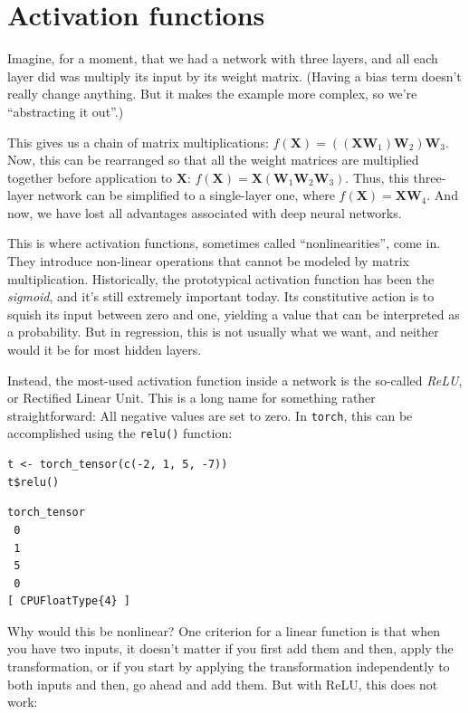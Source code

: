 \documentclass[
  letterpaper,
]{krantz}
\begin{document}
\hypertarget{activation-functions}{%
\section{\texorpdfstring{Activation
functions}{Activation functions}}\label{activation-functions}}

Imagine, for a moment, that we had a network with three layers, and all
each layer did was multiply its input by its weight matrix. (Having a
bias term doesn't really change anything. But it makes the example more
complex, so we're ``abstracting it out''.)

This gives us a chain of matrix multiplications:
\(f(\mathbf{X}) = ((\mathbf{X} \mathbf{W}_1)\mathbf{W}_2)\mathbf{W}_3\).
Now, this can be rearranged so that all the weight matrices are
multiplied together before application to \(\mathbf{X}\):
\(f(\mathbf{X}) = \mathbf{X} (\mathbf{W}_1\mathbf{W}_2\mathbf{W}_3)\).
Thus, this three-layer network can be simplified to a single-layer one,
where \(f(\mathbf{X}) = \mathbf{X} \mathbf{W}_4\). And now, we have lost
all advantages associated with deep neural networks.

This is where activation functions, sometimes called ``nonlinearities'',
come in. They introduce non-linear operations that cannot be modeled by
matrix multiplication. Historically, the prototypical activation
function has been the \emph{sigmoid}, and it's
still extremely important today. Its constitutive action is to squish
its input between zero and one, yielding a value that can be interpreted
as a probability. But in regression, this is not usually what we want,
and neither would it be for most hidden layers.

Instead, the most-used activation function inside a network is the
so-called \emph{ReLU}, or Rectified Linear Unit.
This is a long name for something rather straightforward: All negative
values are set to zero. In \texttt{torch}, this can be accomplished
using the \texttt{relu()} function:

\begin{verbatim}
t <- torch_tensor(c(-2, 1, 5, -7))
t$relu()
\end{verbatim}

\begin{verbatim}
torch_tensor
 0
 1
 5
 0
[ CPUFloatType{4} ]
\end{verbatim}

Why would this be nonlinear? One criterion for a linear function is that
when you have two inputs, it doesn't matter if you first add them and
then, apply the transformation, or if you start by applying the
transformation independently to both inputs and then, go ahead and add
them. But with ReLU, this does not work:
\end{document}
